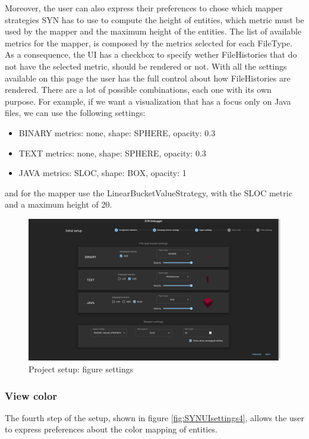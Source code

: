 Moreover, the user can also express their preferences to chose which mapper strategies SYN has to use to compute the height of entities, which metric must be used by the mapper and the maximum height of the entities. 
The list of available metrics for the mapper, is composed by the metrics selected for each FileType.
As a consequence, the UI has a checkbox to specify wether FileHistories that do not have the selected metric, should be rendered or not. 
\bigbreak
With all the settings available on this page the user has the full control about how FileHistories are rendered. 
There are a lot of possible combinations, each one with its own purpose. For example, if we want a visualization that has a focus only on Java files, we can use the following settings:
\begin{itemize}
    \item BINARY metrics: none, shape: SPHERE, opacity: 0.3
    \item TEXT metrics: none, shape: SPHERE, opacity: 0.3
    \item JAVA metrics: SLOC, shape: BOX, opacity: 1
\end{itemize}
and for the mapper use the LinearBucketValueStrategy, with the SLOC metric and a maximum height of 20. 

\begin{figure}
    \center
    \includegraphics[width=\textwidth]{SYNUI-settings3.png}
    \caption{Project setup: figure settings}
    \label{fig:SYNUIsettings3}
\end{figure}

\subsubsection*{View color}
The fourth step of the setup, shown in figure \ref{fig:SYNUIsettings4}, allows the user to express preferences about the color mapping of entities. 

